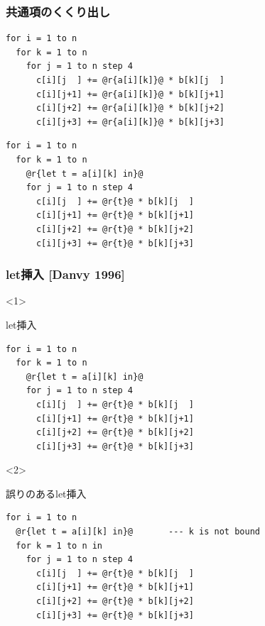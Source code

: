 \documentclass[dvipdfmx,cjk,xcolor=dvipsnames,envcountsect,notheorems,12pt,handout]{beamer} \usepackage{pgfpages} \pgfpagesuselayout{4 on 1}[a4paper,landscape,border shrink=5mm]
\theoremstyle{definition}
\begin{document}
\begin{frame}[fragile]
  \frametitle{共通項のくくり出し}
\begin{lstlisting}
for i = 1 to n
  for k = 1 to n
    for j = 1 to n step 4
      c[i][j  ] += @r{a[i][k]}@ * b[k][j  ]
      c[i][j+1] += @r{a[i][k]}@ * b[k][j+1]
      c[i][j+2] += @r{a[i][k]}@ * b[k][j+2]
      c[i][j+3] += @r{a[i][k]}@ * b[k][j+3]
\end{lstlisting}
  \pause
\begin{lstlisting}
for i = 1 to n
  for k = 1 to n
    @r{let t = a[i][k] in}@
    for j = 1 to n step 4
      c[i][j  ] += @r{t}@ * b[k][j  ]
      c[i][j+1] += @r{t}@ * b[k][j+1]
      c[i][j+2] += @r{t}@ * b[k][j+2]
      c[i][j+3] += @r{t}@ * b[k][j+3]
\end{lstlisting}
\end{frame}

\begin{frame}[fragile]
  \frametitle{let挿入 [Danvy 1996]}

  \begin{onlyenv}<1>
    \begin{exampleblock}{let挿入}
\begin{lstlisting}
for i = 1 to n
  for k = 1 to n
    @r{let t = a[i][k] in}@
    for j = 1 to n step 4
      c[i][j  ] += @r{t}@ * b[k][j  ]
      c[i][j+1] += @r{t}@ * b[k][j+1]
      c[i][j+2] += @r{t}@ * b[k][j+2]
      c[i][j+3] += @r{t}@ * b[k][j+3]
\end{lstlisting}
    \end{exampleblock}
  \end{onlyenv}

  \begin{onlyenv}<2>
    \begin{exampleblock}{誤りのあるlet挿入}
\begin{lstlisting}
for i = 1 to n
  @r{let t = a[i][k] in}@       --- k is not bound
  for k = 1 to n in
    for j = 1 to n step 4
      c[i][j  ] += @r{t}@ * b[k][j  ]
      c[i][j+1] += @r{t}@ * b[k][j+1]
      c[i][j+2] += @r{t}@ * b[k][j+2]
      c[i][j+3] += @r{t}@ * b[k][j+3]
\end{lstlisting}
    \end{exampleblock}
  \end{onlyenv}
\end{frame}

\end{document}

